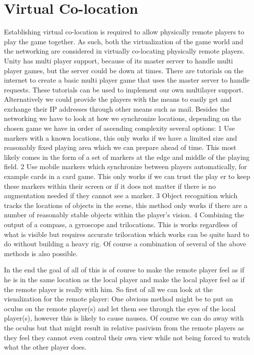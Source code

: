 \section{Virtual Co-location} \label{sec:virtualcolocation}
Establishing virtual co-location is required to allow physically remote players
		to play the game together. As such, both the virtualization of the game world and
		the networking are considered in virtually co-locating physically remote players.
		Unity has multi player support, because of its master server to handle multi player
		games, but the server could be down at times. There are tutorials on the internet
		to create a basic multi player game that uses the master server to handle requests.
		These tutorials can be used to implement our own multilayer support. Alternatively
		we could provide the players with the means to easily get and exchange their IP
		addresses through other means such as mail. 
		Besides the networking we have to look at how we synchronize locations, depending on
		the chosen game we have in order of ascending complexity several options:
		1 Use markers with a known locations, this only works if we have a limited size 
		and reasonably fixed playing area which we can prepare ahead of time. This most 
		likely comes in the form of a set of markers at the edge and middle of the playing 
		field. 
		2 Use mobile markers which synchronize between players automatically, for example
		cards in a card game. This only works if we can trust the play er to keep these markers
		within their screen or if it does not matter if there is no augmentation needed if they
		cannot see a marker. 
		3 Object recognition which tracks the locations of objects in the scene,
		this method only works if there are a number of reasonably stable objects 
		within the player's vision. 
		4 Combining the output of a compass, a gyroscope and trilocations. This is 
		works regardless of what is visible but requires accurate trilocation which works
		can be quite hard to do without building a heavy rig. 
		Of course a combination of several of the above methods is also possible. 
	
		In the end the goal of all of this is of course to make the remote player feel 
		as if he is in the same location as the local player and make the local player feel 
		as if the remote player is really with him. So first of all we can look at the 
		visualization for the remote player:
		One obvious method might be to put an oculus on the remote player(s) and let 
		them see through the eyes of the local player(s), however this is likely to cause nausea. 
		Of course we can do away with the oculus but that might result in relative pasivism from 
		the remote players as they feel they cannot 
		even control their own view while not being forced to watch what the other player does. 


